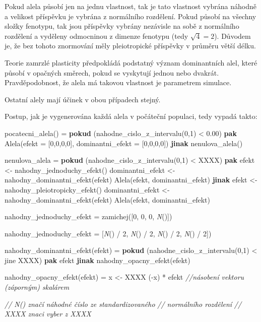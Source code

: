 Pokud alela působí jen na jednu vlastnost, tak je tato vlastnost vybrána náhodně a velikost příspěvku je vybrána z
normálního rozdělení. Pokud působí na všechny složky fenotypu, tak jsou příspěvky vybrány nezávisle na sobě z normálního
rozdělení a vyděleny odmocninou z dimenze fenotypu (tedy $\sqrt{4} = 2$). Důvodem je, že bez tohoto znormování měly
pleiotropické příspěvky v průměru větší délku.

Teorie zamrzlé plasticity předpokládá podstatný význam dominantních alel, které působí v opačných směrech, pokud se
vyskytují jednou nebo dvakrát. Pravděpodobnost, že alela má takovou vlastnost je parametrem simulace.

Ostatní alely mají účinek v obou případech stejný.


Postup, jak je vygenerována každá alela v počáteční populaci, tedy vypadá takto:

\begin{code}[commandchars=\\\{\}]

    pocatecni_alela() =
        \textbf{pokud} (nahodne_cislo_z_intervalu(0,1) < 0.00)
            \textbf{pak} Alela(efekt = [0,0,0,0], dominantni_efekt = [0,0,0,0])
            \textbf{jinak} nenulova_alela()

    nenulova_alela =
        \textbf{pokud} (nahodne_cislo_z_intervalu(0,1) < XXXX)
            \textbf{pak}
                efekt <- nahodny_jednoduchy_efekt()
                dominantni_efekt <- nahodny_dominantni_efekt(efekt)
                Alela(efekt, dominantni_efekt)
            \textbf{jinak}
                efekt <- nahodny_pleiotropicky_efekt()
                dominantni_efekt <- nahodny_dominantni_efekt(efekt)
                Alela(efekt, dominantni_efekt)

    nahodny_jednoduchy_efekt =
        zamichej([0, 0, 0, \textit{N}()])

    nahodny_jednoduchy_efekt =
        [\textit{N}() / 2, \textit{N}() / 2, \textit{N}() / 2, \textit{N}() / 2])

    nahodny_dominantni_efekt(efekt) =
        \textbf{pokud} (nahodne_cislo_z_intervalu(0,1) < jine XXXX)
            \textbf{pak} efekt
            \textbf{jinak} nahodny_opacny_efekt(efekt)

    nahodny_opacny_efekt(efekt) =
        x <- XXXX
        (-x) * efekt \textit{//násobení vektoru (záporným) skalárem}

    \textit{// {N}() značí náhodné číslo ze standardizovaného}
    \textit{//       normálního rozdělení}
    \textit{// XXXX znaci vyber z XXXX}
\end{code}

